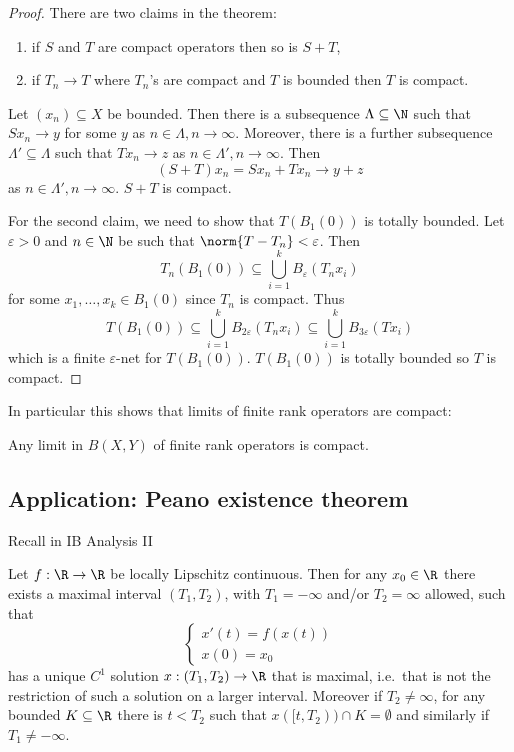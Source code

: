 \documentclass[a4paper]{article}
\begin{document}
\begin{proof}
  There are two claims in the theorem:
  \begin{enumerate}
  \item if \(S\) and \(T\) are compact operators then so is \(S + T\),
  \item if \(T_n \to T\) where \(T_n\)'s are compact and \(T\) is bounded then \(T\) is compact.
  \end{enumerate}

  Let \((x_n) \subseteq X\) be bounded. Then there is a subsequence \(\Lambda \subseteq \N\) such that \(Sx_n \to y\) for some \(y\) as \(n \in \Lambda, n \to \infty\). Moreover, there is a further subsequence \(\Lambda' \subseteq \Lambda\) such that \(Tx_n \to z\) as \(n \in \Lambda', n \to \infty\). Then
  \[
    (S + T) x_n = S x_n + T x_n \to y + z
  \]
  as \(n \in \Lambda', n \to \infty\). \(S + T\) is compact.

  For the second claim, we need to show that \(T(B_1(0))\) is totally bounded. Let \(\varepsilon > 0\) and \(n \in \N\) be such that \(\norm{T - T_n} < \varepsilon\). Then
  \[
    T_n(B_1(0)) \subseteq \bigcup_{i = 1}^k B_\varepsilon (T_nx_i)
  \]
  for some \(x_1, \dots, x_k \in B_1(0)\) since \(T_n\) is compact. Thus
  \[
    T(B_1(0)) \subseteq \bigcup_{i = 1}^k B_{2\varepsilon} (T_n x_i) \subseteq \bigcup_{i = 1}^k B_{3 \varepsilon} (Tx_i)
  \]
  which is a finite \(\varepsilon\)-net for \(T(B_1(0))\). \(T(B_1(0))\) is totally bounded so \(T\) is compact.
\end{proof}

In particular this shows that limits of finite rank operators are compact:

\begin{corollary}
  Any limit in \(B(X, Y)\) of finite rank operators is compact.
\end{corollary}

\subsection{Application: Peano existence theorem}

Recall in IB Analysis II

\begin{theorem}
  Let \(f: \R \to \R\) be locally Lipschitz continuous. Then for any \(x_0 \in \R\) there exists a maximal interval \((T_1, T_2)\), with \(T_1 = -\infty\) and/or \(T_2 = \infty\) allowed, such that
  \[
    \label{eqn:differential equation}
    \left\{
    \begin{array}{l}
      x'(t) = f(x(t)) \\
      x(0) = x_0
    \end{array}
    \right.
    \tag{\ast}
  \]
  has a unique \(C^1\) solution \(x: (T_1, T_2) \to \R\) that is maximal, i.e.\ that is not the restriction of such a solution on a larger interval. Moreover if \(T_2 \neq \infty\), for any bounded \(K \subseteq \R\) there is \(t < T_2\) such that \(x([t, T_2)) \cap K = \emptyset\) and similarly if \(T_1 \neq -\infty\).
\end{theorem}
\end{document}
